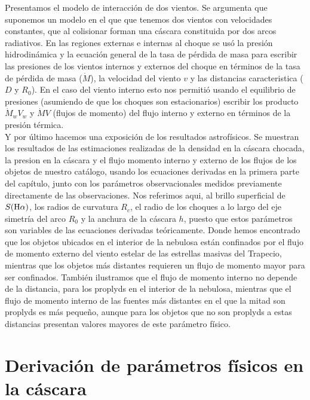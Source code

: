 Presentamos el modelo de interacción de dos vientos. Se argumenta que suponemos un modelo en el que que tenemos dos vientos con velocidades constantes, que al colisionar forman una cáscara constituida por dos arcos radiativos. En las regiones externas e internas al choque se usó la presión hidrodinámica y la ecuación general de la tasa de pérdida de masa para escribir las presiones de los vientos internos y externos del choque en términos de la tasa de pérdida de masa (\(\dot{M}\)), la velocidad del viento \(v\) y las distancias caracteristica (\(D\) y \(R_{0}\)). En el caso del viento interno esto nos permitió usando el equilibrio de presiones (asumiendo de que los choques son estacionarios) escribir los producto  \(\dot{M}_{w}V_{w}\) y \(\dot{M}V\) (flujos de momento) del flujo interno y externo en términos de la presión térmica.\\

Y por último hacemos una  exposición de los resultados astrofísicos. Se muestran los resultados de las estimaciones realizadas de la densidad en la cáscara chocada, la presion en la cáscara y el flujo momento interno y externo de los flujos de los objetos de nuestro catálogo, usando los ecuaciones derivadas en la primera parte del capítulo, junto con los parámetros observacionales medidos previamente directamente de las observaciones. Nos referimos aqui, al brillo superficial de \ha{}  \(S(\mathrm{H}\alpha{})\), los radios de curvatura \(R_{c}\), el radio de los choques a lo largo del eje simetría del arco \(R_{0}\) y la anchura de la cáscara \(h\), puesto que estos parámetros son variables de las ecuaciones derivadas teóricamente. Donde hemos encontrado que los objetos ubicados en el interior de la nebulosa están confinados por el flujo de momento externo  del viento estelar de las estrellas masivas del Trapecio, mientras que los objetos más distantes requieren un flujo de momento mayor para ser confinados. También ilustramos que el flujo de momento interno no depende de la distancia, para los proplyds en el interior de la nebulosa, mientras que el flujo de momento interno de las fuentes más distantes en el que la mitad son proplyds es más pequeño, aunque para los objetos que no son proplyds a estas distancias presentan valores mayores de este parámetro físico. 

\section{Derivación de parámetros físicos en la cáscara}
\label{sec:phy}

